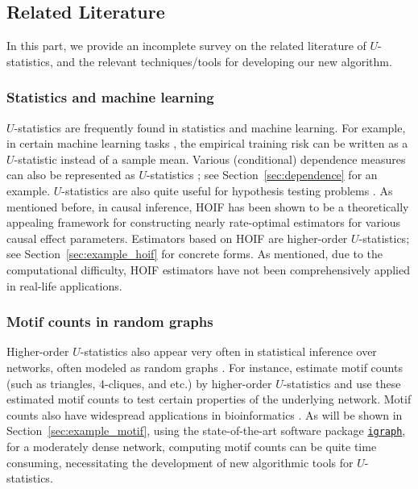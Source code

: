 \documentclass[twoside,11pt]{article}
\newcommand{\libref}[2]{\href{#2}{\texttt{#1}}}
\def\igraph{\libref{igraph}{https://igraph.org/}}
\begin{document}
\subsection*{Related Literature}

In this part, we provide an incomplete survey on the related literature of $U$-statistics, and the relevant techniques/tools for developing our new algorithm.

\subsubsection*{Statistics and machine learning}

$U$-statistics are frequently found in statistics and machine learning. For example, in certain machine learning tasks \citep{clemenccon2008ranking, clemenccon2013maximal, shen2025engression}, the empirical training risk can be written as a $U$-statistic instead of a sample mean. Various (conditional) dependence measures can also be represented as $U$-statistics \citep{yao2018testing, neykov2021minimax, azadkia2021simple, shao2025u, zhang2025adaptive}; see Section~\ref{sec:dependence} for an example. $U$-statistics are also quite useful for hypothesis testing problems \citep{chen2019randomized, sturma2024testing}. As mentioned before, in causal inference, HOIF has been shown to be a theoretically appealing framework for constructing nearly rate-optimal estimators for various causal effect parameters. Estimators based on HOIF are higher-order $U$-statistics; see Section~\ref{sec:example_hoif} for concrete forms. As mentioned, due to the computational difficulty, HOIF estimators have not been comprehensively applied in real-life applications. 

\subsubsection*{Motif counts in random graphs}

Higher-order $U$-statistics also appear very often in statistical inference over networks, often modeled as random graphs \citep{chatterjee2024higher, jin2025counting}. For instance, \citet{chatterjee2024higher} estimate motif counts (such as triangles, 4-cliques, and etc.) by higher-order $U$-statistics and use these estimated motif counts to test certain properties of the underlying network. Motif counts also have widespread applications in bioinformatics \citep{wernicke2006fanmod}. As will be shown in Section~\ref{sec:example_motif}, using the state-of-the-art software package \igraph{}, for a moderately dense network, computing motif counts can be quite time consuming, necessitating the development of new algorithmic tools for $U$-statistics. 
\end{document}

